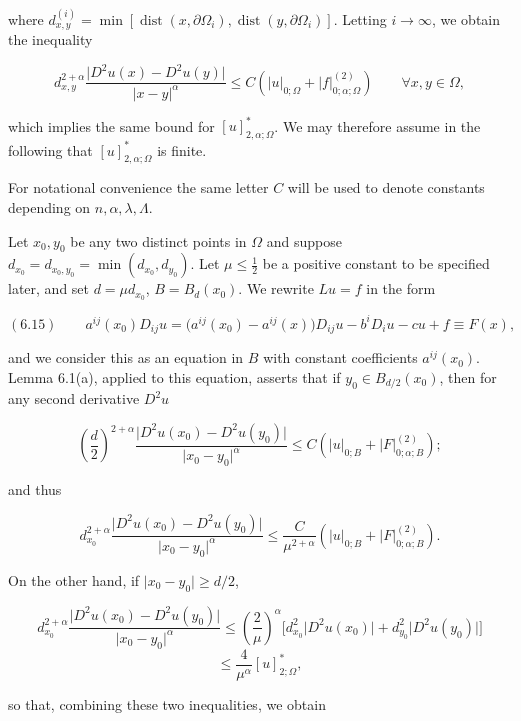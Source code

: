 \begin{theorem}
\noindent where $d^{(i)}_{x,y}=\min[\operatorname{dist}(x,\partial\Omega_i),\operatorname{dist}(y,\partial\Omega_i)]$. Letting $i\to\infty$, we obtain the inequality

\[
d_{x,y}^{2+\alpha}\frac{\lvert D^2u(x)-D^2u(y)\rvert}{\lvert x-y\rvert^\alpha}
\le C\!\left(\lvert u\rvert_{0;\Omega}+\lvert f\rvert^{(2)}_{0;\alpha;\Omega}\right)
\qquad \forall x,y\in\Omega,
\]

\noindent which implies the same bound for $[u]^{*}_{2,\alpha;\Omega}$. We may therefore assume in the following that $[u]^{*}_{2,\alpha;\Omega}$ is finite.

\noindent For notational convenience the same letter $C$ will be used to denote constants depending on $n,\alpha,\lambda,\Lambda$.

\noindent Let $x_0,y_0$ be any two distinct points in $\Omega$ and suppose $d_{x_0}=d_{x_0,y_0}=\min(d_{x_0},d_{y_0})$.
Let $\mu\le \tfrac12$ be a positive constant to be specified later, and set $d=\mu d_{x_0}$, $B=B_d(x_0)$.
We rewrite $Lu=f$ in the form

\begin{equation}
(6.15)\qquad a^{ij}(x_0)D_{ij}u=\bigl(a^{ij}(x_0)-a^{ij}(x)\bigr)D_{ij}u-b^iD_iu-cu+f\equiv F(x),
\end{equation}

\noindent and we consider this as an equation in $B$ with constant coefficients $a^{ij}(x_0)$. Lemma 6.1(a), applied to this equation, asserts that if $y_0\in B_{d/2}(x_0)$, then for any second derivative $D^2u$

\[
\left(\frac d2\right)^{2+\alpha}\frac{\lvert D^2u(x_0)-D^2u(y_0)\rvert}{\lvert x_0-y_0\rvert^\alpha}
\le C\!\left(\lvert u\rvert_{0;B}+\lvert F\rvert^{(2)}_{0;\alpha;B}\right);
\]

\noindent and thus

\[
d_{x_0}^{2+\alpha}\frac{\lvert D^2u(x_0)-D^2u(y_0)\rvert}{\lvert x_0-y_0\rvert^\alpha}
\le \frac{C}{\mu^{2+\alpha}}\left(\lvert u\rvert_{0;B}+\lvert F\rvert^{(2)}_{0;\alpha;B}\right).
\]

\noindent On the other hand, if $\lvert x_0-y_0\rvert\ge d/2$,

\[
d_{x_0}^{2+\alpha}\frac{\lvert D^2u(x_0)-D^2u(y_0)\rvert}{\lvert x_0-y_0\rvert^\alpha}
\le \left(\frac{2}{\mu}\right)^\alpha \bigl[d_{x_0}^2\lvert D^2u(x_0)\rvert+d_{y_0}^2\lvert D^2u(y_0)\rvert\bigr]
\]
\[
\le \frac{4}{\mu^\alpha}[u]^{*}_{2;\Omega},
\]

\noindent so that, combining these two inequalities, we obtain


\end{theorem}
